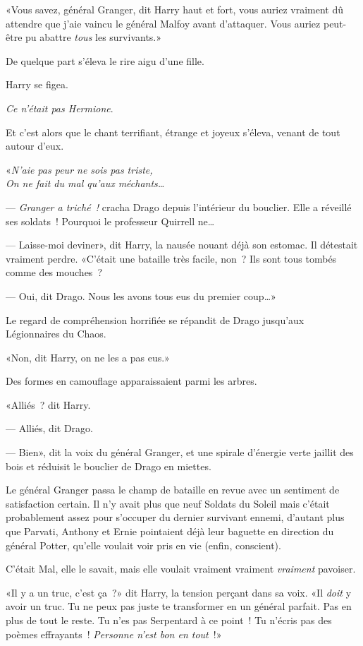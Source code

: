 «Vous savez, général Granger, dit Harry haut et fort, vous auriez vraiment dû attendre que j'aie vaincu le général Malfoy avant d'attaquer. Vous auriez peut-être pu abattre \emph{tous} les survivants.»

De quelque part s'éleva le rire aigu d'une fille.

Harry se figea.

\emph{Ce n'était pas Hermione}.

Et c'est alors que le chant terrifiant, étrange et joyeux s'éleva, venant de tout autour d'eux.

«\emph{N'aie pas peur ne sois pas triste,\\ On ne fait du mal qu'aux méchants…}

--- \emph{Granger a triché~!} cracha Drago depuis l'intérieur du bouclier. Elle a réveillé ses soldats~! Pourquoi le professeur Quirrell ne…

--- Laisse-moi deviner», dit Harry, la nausée nouant déjà son estomac. Il détestait vraiment perdre. «C'était une bataille très facile, non~? Ils sont tous tombés comme des mouches~?

--- Oui, dit Drago. Nous les avons tous eus du premier coup…»

Le regard de compréhension horrifiée se répandit de Drago jusqu'aux Légionnaires du Chaos.

«Non, dit Harry, on ne les a pas eus.»

Des formes en camouflage apparaissaient parmi les arbres.

«Alliés~? dit Harry.

--- Alliés, dit Drago.

--- Bien», dit la voix du général Granger, et une spirale d'énergie verte jaillit des bois et réduisit le bouclier de Drago en miettes.

\later

Le général Granger passa le champ de bataille en revue avec un sentiment de satisfaction certain. Il n'y avait plus que neuf Soldats du Soleil mais c'était probablement assez pour s'occuper du dernier survivant ennemi, d'autant plus que Parvati, Anthony et Ernie pointaient déjà leur baguette en direction du général Potter, qu'elle voulait voir pris en vie (enfin, conscient).

C'était Mal, elle le savait, mais elle voulait vraiment vraiment \emph{vraiment} pavoiser.

«Il y a un truc, c'est ça~?» dit Harry, la tension perçant dans sa voix. «Il \emph{doit} y avoir un truc. Tu ne peux pas juste te transformer en un général parfait. Pas en plus de tout le reste. Tu n'es pas Serpentard à ce point~! Tu n'écris pas des poèmes effrayants~! \emph{Personne n'est bon en tout}~!»

